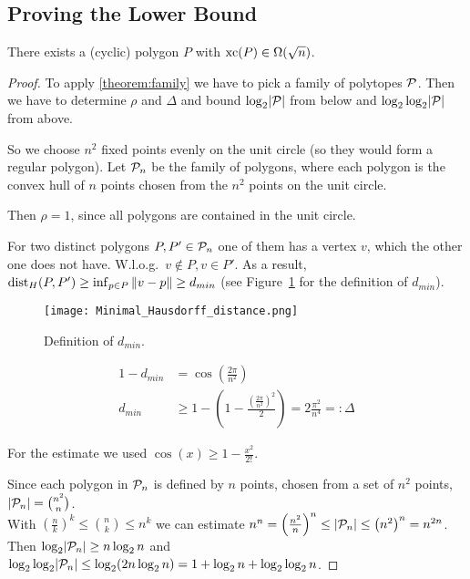 \subsection{Proving the Lower Bound}

\begin{corollary}\label{corollary:lower-bound}
  There exists a (cyclic) polygon $P$ with $\xc(P) \in \Omega(\sqrt{n})$.
\end{corollary}
\begin{proof}
  To apply \ref{theorem:family} we have to pick a family of polytopes $\P$. Then we have to determine $\rho$ and $\Delta$ and bound $\log_2 \abs{\P}$ from below and $\log_2 \log_2 \abs{\P}$ from above.

  So we choose $n^2$ fixed points evenly on the unit circle (so they would form a regular polygon). Let $\P_n$ be the family of polygons, where each polygon is the convex hull of $n$ points chosen from the $n^2$ points on the unit circle.

  Then $\rho = 1$, since all polygons are contained in the unit circle.

  For two distinct polygons $P, P' \in \P_n$ one of them has a vertex $v$, which the other one does not have. W.l.o.g.\ $v \notin P, v \in P'$. As a result, $\dist_H(P,P') \geq \inf_{p \in P} \norm{v-p} \geq d_{min}$ (see Figure~\ref{fig:distance} for the definition of $d_{min}$).

  \begin{figure}[ht]
    \centering
    \texttt{[image: Minimal\_Hausdorff\_distance.png]}
    \caption{Definition of $d_{min}$.}
    \label{fig:distance}
  \end{figure}

  \begin{align*}
    1 - d_{min} & = \cos\left( \frac{2 \pi}{n^2} \right)                                                                \\
    d_{min}     & \geq 1 - \left(1 - \frac{\left(\frac{2 \pi}{n^2}\right)^2}{2} \right) = 2 \frac{\pi^2}{n^4} =: \Delta
  \end{align*}

  For the estimate we used $\cos(x) \geq 1 - \frac{x^2}{2!}$.

  Since each polygon in $\P_n$ is defined by $n$ points, chosen from a set of $n^2$ points, $\abs{\P_n} = \binom{n^2}{n}$.\\
  With $(\frac{n}{k})^k \leq \binom{n}{k} \leq n^k$ we can estimate $n^n = \left( \frac{n^2}{n} \right)^n \leq \abs{\P_n} \leq \left( n^2 \right)^n = n^{2n}$.\\
  Then $\log_2 \abs{\P_n} \geq n \log_2 n$ and $\log_2 \log_2 \abs{\P_n} \leq \log_2 (2n \log_2 n) = 1 + \log_2 n + \log_2 \log_2 n$.


\end{proof}
